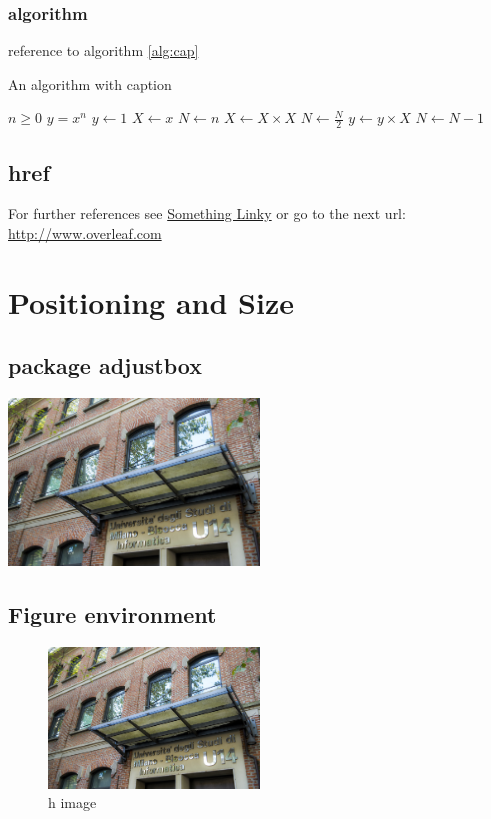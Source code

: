 \documentclass[a4paper, oneside]{book}
\begin{document}
\subsection{algorithm}

reference to algorithm \ref{alg:cap}
\begin{algorithm}[!h]
\caption{An algorithm with caption}\label{alg:cap}
\begin{algorithmic}
\Require $n \geq 0$
\Ensure $y = x^n$
\State $y \gets 1$
\State $X \gets x$
\State $N \gets n$
    \State $X \gets X \times X$
    \State $N \gets \frac{N}{2}$  
    \State $y \gets y \times X$
    \State $N \gets N - 1$
\EndIf
\EndWhile
\end{algorithmic}
\end{algorithm}

\section{href}
For further references see \href{http://www.overleaf.com}{Something Linky} 
or go to the next url: \url{http://www.overleaf.com}

\chapter{Positioning and Size}

\section{package adjustbox}
\includegraphics[width=0.5\textwidth, right]{u14.jpg}

\section{Figure environment}

\begin{figure}[h]
\includegraphics[width=0.5\textwidth, inner]{u14}
\caption{h image}
\label{fig:figure4}
\end{figure}
\end{document}
